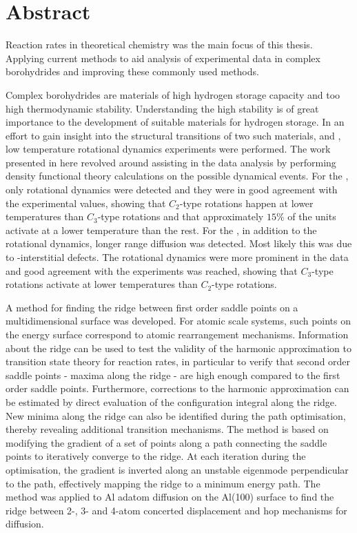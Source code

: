 \chapter*{Abstract}

Reaction rates in theoretical chemistry was the main focus of this thesis.
Applying current methods to aid analysis of experimental data in complex borohydrides and improving these commonly used methods.

Complex borohydrides are materials of high hydrogen storage capacity and too high thermodynamic stability.
Understanding the high stability is of great importance to the development of suitable materials for hydrogen storage.
In an effort to gain insight into the structural transitions of two such materials,  and , low temperature rotational dynamics experiments were performed.
The work presented in here revolved around assisting in the data analysis by performing density functional theory calculations on the possible dynamical events.
For the , only rotational dynamics were detected and they were in good agreement with the experimental values, showing that $C_2$-type rotations happen at lower temperatures than $C_3$-type rotations and that approximately $15\%$ of the  units activate at a lower temperature than the rest.
For the , in addition to the rotational dynamics, longer range diffusion was detected.
Most likely this was due to -interstitial defects.
The rotational dynamics were more prominent in the data and good agreement with the experiments was reached, showing that $C_3$-type rotations activate at lower temperatures than $C_2$-type rotations.

A method for finding the ridge between first order saddle points on a multidimensional surface was developed.
For atomic scale systems, such points on the energy surface correspond to atomic rearrangement mechanisms.
Information about the ridge can be used to test the validity of the harmonic approximation to transition state theory for reaction rates,
in particular to verify that second order saddle points - maxima along the ridge - are high enough compared to the first order saddle points.
Furthermore, corrections to the harmonic approximation can be estimated by direct evaluation of the configuration integral along the ridge.
New minima along the ridge can also be identified during the path optimisation,
thereby revealing additional transition mechanisms.
The method is based on modifying the gradient of a set of points along a path connecting the saddle points to iteratively converge to the ridge.
At each iteration during the optimisation, the gradient is inverted along an unstable eigenmode perpendicular to the path, effectively mapping the ridge to a minimum energy path.
The method was applied to Al adatom diffusion on the Al(100) surface to find the ridge between 2-, 3- and 4-atom concerted displacement
and hop mechanisms for diffusion.
